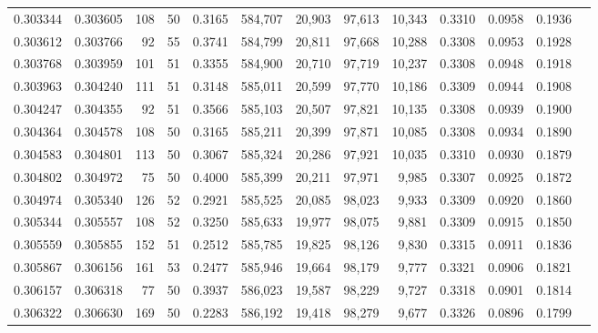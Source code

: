 \begin{tabular}{rrrrrrrrrrrrr}
0.303344 & 0.303605 &   108 &  50 &                                     0.3165 & 584,707 &  20,903 &  97,613 &  10,343 & 0.3310 & 0.0958 & 0.1936 \\
0.303612 & 0.303766 &    92 &  55 &                                     0.3741 & 584,799 &  20,811 &  97,668 &  10,288 & 0.3308 & 0.0953 & 0.1928 \\
0.303768 & 0.303959 &   101 &  51 &                                     0.3355 & 584,900 &  20,710 &  97,719 &  10,237 & 0.3308 & 0.0948 & 0.1918 \\
0.303963 & 0.304240 &   111 &  51 &                                     0.3148 & 585,011 &  20,599 &  97,770 &  10,186 & 0.3309 & 0.0944 & 0.1908 \\
0.304247 & 0.304355 &    92 &  51 &                                     0.3566 & 585,103 &  20,507 &  97,821 &  10,135 & 0.3308 & 0.0939 & 0.1900 \\
0.304364 & 0.304578 &   108 &  50 &                                     0.3165 & 585,211 &  20,399 &  97,871 &  10,085 & 0.3308 & 0.0934 & 0.1890 \\
0.304583 & 0.304801 &   113 &  50 &                                     0.3067 & 585,324 &  20,286 &  97,921 &  10,035 & 0.3310 & 0.0930 & 0.1879 \\
0.304802 & 0.304972 &    75 &  50 &                                     0.4000 & 585,399 &  20,211 &  97,971 &   9,985 & 0.3307 & 0.0925 & 0.1872 \\
0.304974 & 0.305340 &   126 &  52 &                                     0.2921 & 585,525 &  20,085 &  98,023 &   9,933 & 0.3309 & 0.0920 & 0.1860 \\
0.305344 & 0.305557 &   108 &  52 &                                     0.3250 & 585,633 &  19,977 &  98,075 &   9,881 & 0.3309 & 0.0915 & 0.1850 \\
0.305559 & 0.305855 &   152 &  51 &                                     0.2512 & 585,785 &  19,825 &  98,126 &   9,830 & 0.3315 & 0.0911 & 0.1836 \\
0.305867 & 0.306156 &   161 &  53 &                                     0.2477 & 585,946 &  19,664 &  98,179 &   9,777 & 0.3321 & 0.0906 & 0.1821 \\
0.306157 & 0.306318 &    77 &  50 &                                     0.3937 & 586,023 &  19,587 &  98,229 &   9,727 & 0.3318 & 0.0901 & 0.1814 \\
0.306322 & 0.306630 &   169 &  50 &                                     0.2283 & 586,192 &  19,418 &  98,279 &   9,677 & 0.3326 & 0.0896 & 0.1799 \\

\end{tabular}

